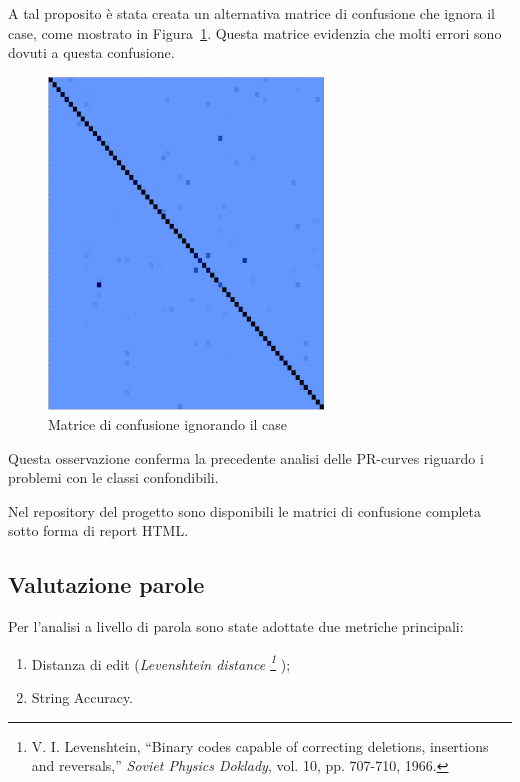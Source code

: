 A tal proposito è stata creata un alternativa matrice di confusione che ignora il case, come mostrato in Figura~\ref{fig:confusion_matrix_case_insensitive}. Questa matrice evidenzia che molti errori sono dovuti a questa confusione.
\begin{figure}[htbp]
    \centering
    \includegraphics[width=0.65\textwidth]{images/confusion_matrix_case.png}
    \caption{Matrice di confusione ignorando il case}
    \label{fig:confusion_matrix_case_insensitive}
\end{figure}

Questa osservazione conferma la precedente analisi delle PR-curves riguardo i problemi con le classi confondibili.

Nel repository del progetto sono disponibili le matrici di confusione completa sotto forma di report HTML.

\subsection{Valutazione parole}
\label{sec:valutazione-stringhe}

Per l'analisi a livello di parola sono state adottate due metriche principali:
\begin{enumerate}
    \item Distanza di edit (\emph{Levenshtein distance \footnote{V. I. Levenshtein, “Binary codes capable of correcting deletions, insertions and reversals,” \textit{Soviet Physics Doklady}, vol. 10, pp. 707-710, 1966.} });
    \item String Accuracy.
\end{enumerate}

